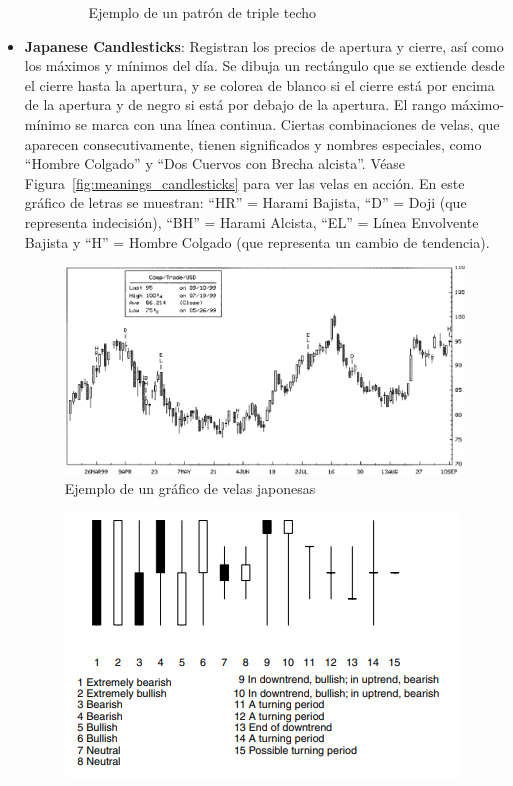 \begin{itemize}
\begin{itemize}
\begin{figure}[H]
                    \caption{Ejemplo de un patrón de triple techo}
                \end{figure}
        \end{itemize}
    \item \textbf{Japanese Candlesticks}: Registran los precios de apertura y cierre, así como los máximos y mínimos del día. Se dibuja un rectángulo que se extiende desde el cierre hasta la apertura, y se colorea de blanco si el cierre está por encima de la apertura y de negro si está por debajo de la apertura. El rango máximo-mínimo se marca con una línea continua. Ciertas combinaciones de velas, que aparecen consecutivamente, tienen significados y nombres especiales, como ``Hombre Colgado'' y ``Dos Cuervos con Brecha alcista''. Véase Figura~\ref{fig:meanings_candlesticks} para ver las velas en acción. En este gráfico de letras se muestran: ``HR'' = Harami Bajista, ``D'' = Doji (que representa indecisión), ``BH'' = Harami Alcista, ``EL'' = Línea Envolvente Bajista y ``H'' = Hombre Colgado (que representa un cambio de tendencia).
        \begin{figure}[H]
            \centering
            \includegraphics[width=0.65\linewidth]{Imagenes/16_Prediccion/Candlestick char.png}
            \caption{Ejemplo de un gráfico de velas japonesas}
        \end{figure}
        \begin{figure}[H]
            \centering
            \includegraphics[width=0.65\linewidth]{Imagenes/16_Prediccion/Meanings candlesticks.png}

\end{figure}
\end{itemize}
